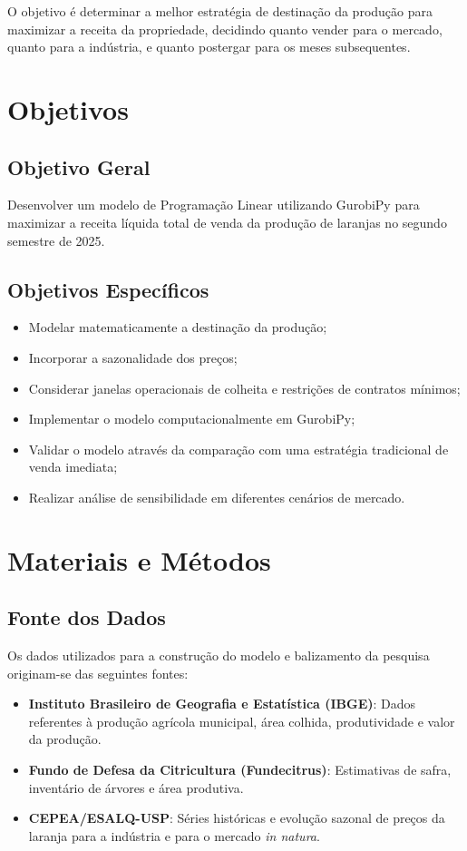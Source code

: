 \documentclass[12pt, a4paper]{article}
\begin{document}
O objetivo é determinar a melhor estratégia de destinação da produção para maximizar a receita da propriedade, decidindo quanto vender para o mercado, quanto para a indústria, e quanto postergar para os meses subsequentes.

\section{Objetivos}

\subsection{Objetivo Geral}
Desenvolver um modelo de Programação Linear utilizando GurobiPy para maximizar a receita líquida total de venda da produção de laranjas no segundo semestre de 2025.

\subsection{Objetivos Específicos}
\begin{itemize}
    \item Modelar matematicamente a destinação da produção;
    \item Incorporar a sazonalidade dos preços;
    \item Considerar janelas operacionais de colheita e restrições de contratos mínimos;
    \item Implementar o modelo computacionalmente em GurobiPy;
    \item Validar o modelo através da comparação com uma estratégia tradicional de venda imediata;
    \item Realizar análise de sensibilidade em diferentes cenários de mercado.
\end{itemize}

\section{Materiais e Métodos}

\subsection{Fonte dos Dados}
Os dados utilizados para a construção do modelo e balizamento da pesquisa originam-se das seguintes fontes:
\begin{itemize}
    \item \textbf{Instituto Brasileiro de Geografia e Estatística (IBGE)}: Dados referentes à produção agrícola municipal, área colhida, produtividade e valor da produção\cite{ibge_pam}.
    \item \textbf{Fundo de Defesa da Citricultura (Fundecitrus)}: Estimativas de safra, inventário de árvores e área produtiva\cite{fundecitrus2025, fundecitrus_pes}.
    \item \textbf{CEPEA/ESALQ-USP}: Séries históricas e evolução sazonal de preços da laranja para a indústria e para o mercado \textit{in natura}\cite{cepea_citros}.
\end{itemize}
\end{document}
